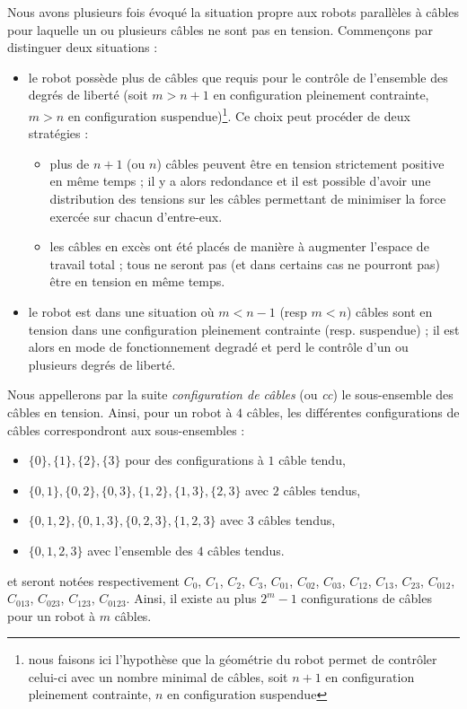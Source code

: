 Nous avons plusieurs fois évoqué la situation propre aux robots parallèles à câbles pour laquelle un ou plusieurs câbles ne sont pas en tension. Commençons par distinguer deux situations :
\begin{itemize}
 \item le robot possède plus de câbles que requis pour le contrôle de l'ensemble des degrés de liberté (soit $m > n+1$ en configuration pleinement contrainte, $m > n$ en configuration suspendue)\footnote{nous faisons ici l'hypothèse que la géométrie du robot permet de contrôler celui-ci avec un nombre minimal de câbles, soit $n+1$ en configuration pleinement contrainte, $n$ en configuration suspendue}. Ce choix peut procéder de deux stratégies :
 \begin{itemize}
  \item plus de $n+1$ (ou $n$) câbles peuvent être en tension strictement positive en même temps ; il y a alors redondance et il est possible d'avoir une distribution des tensions sur les câbles permettant de minimiser la force exercée sur chacun d'entre-eux.
  \item les câbles en excès ont été placés de manière à augmenter l'espace de travail total ; tous ne seront pas (et dans certains cas ne pourront pas) être en tension en même temps.
 \end{itemize}
 \item le robot est dans une situation où $m < n-1$ (resp $m < n$) câbles sont en tension dans une configuration pleinement contrainte (resp. suspendue) ; il est alors en mode de fonctionnement degradé et perd le contrôle d'un ou plusieurs degrés de liberté.
\end{itemize}

Nous appellerons par la suite {\it configuration de câbles} (ou {\it cc}) le sous-ensemble des câbles en tension. Ainsi, pour un robot à $4$ câbles, les différentes configurations de câbles correspondront aux sous-ensembles :
\begin{itemize}
 \item $\{0\},\{1\},\{2\},\{3\}$ pour des configurations à $1$ câble tendu,
 \item $\{0,1\},\{0,2\},\{0,3\},\{1,2\},\{1,3\},\{2,3\}$ avec $2$ câbles tendus,
 \item $\{0,1,2\},\{0,1,3\},\{0,2,3\},\{1,2,3\}$ avec $3$ câbles tendus,
 \item $\{0,1,2,3\}$ avec l'ensemble des $4$ câbles tendus.
\end{itemize}
et seront notées respectivement $C_{0}$, $C_{1}$, $C_{2}$, $C_{3}$, $C_{01}$, $C_{02}$, $C_{03}$, $C_{12}$, $C_{13}$, $C_{23}$, $C_{012}$, $C_{013}$, $C_{023}$, $C_{123}$, $C_{0123}$. Ainsi, il existe au plus $2^m-1$ configurations de câbles pour un robot à $m$ câbles.

